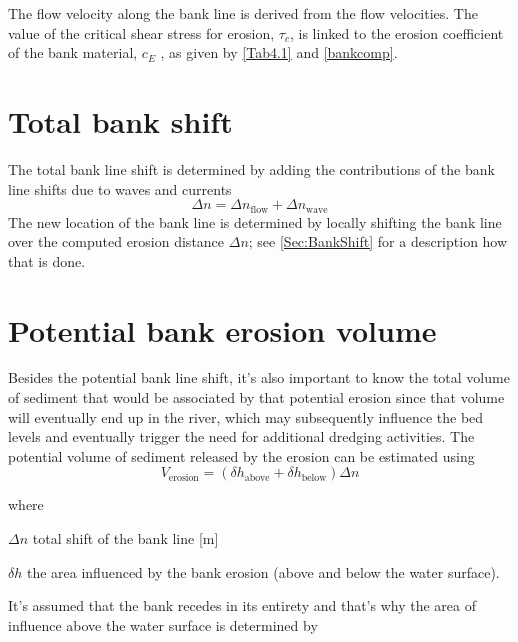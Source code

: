 The flow velocity along the bank line is derived from the \dflowfm flow velocities.
The value of the critical shear stress for erosion, $\tau_c$, is linked to the erosion coefficient of the bank material, $c_E$ , as given by \autoref{Tab4.1} and \autoref{bankcomp}.

\section{Total bank shift} \label{Sec4.3}

The total bank line shift is determined by adding the contributions of the bank line shifts due to waves and currents
%
\begin{equation}
\Delta n = \Delta n_\text{flow} + \Delta n_\text{wave}
\end{equation}
%
The new location of the bank line is determined by locally shifting the bank line over the computed erosion distance $\Delta n$; see \autoref{Sec:BankShift} for a description how that is done.

\section{Potential bank erosion volume} \label{Sec4.4}

Besides the potential bank line shift, it's also important to know the total volume of sediment that would be associated by that potential erosion since that volume will eventually end up in the river, which may subsequently influence the bed levels and eventually trigger the need for additional dredging activities.
The potential volume of sediment released by the erosion can be estimated using
%
\begin{equation}
V_\text{erosion} = ( \delta h_\text{above} + \delta h_\text{below} ) \Delta n
\end{equation}

where 
\begin{symbollist}
	\item[$\Delta n$] total shift of the bank line [m]
	\item[$\delta h$] the area influenced by the bank erosion (above and below the water surface).
\end{symbollist}
It's assumed that the bank recedes in its entirety and that's why the area of influence above the water surface is determined by

